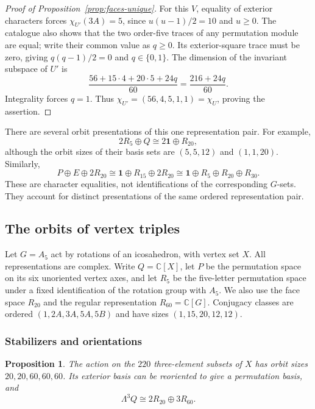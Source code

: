 \documentclass[11pt,a4paper]{article}
\newtheorem{proposition}{Proposition}[section]
\begin{document}
\begin{proof}[Proof of Proposition~\ref{prop:faces-unique}]
For this $V$, equality of exterior characters forces
$\chi_{U'}(3A)=5$, since $u(u-1)/2=10$ and $u\geq0$. The catalogue
also shows that the two order-five traces of any permutation module are
equal; write their common value as $q\geq0$. Its exterior-square trace
must be zero, giving $q(q-1)/2=0$ and $q\in\{0,1\}$.
The dimension of the invariant subspace of $U'$ is
\[
\frac{56+15\cdot4+20\cdot5+24q}{60}
=\frac{216+24q}{60}.
\]
Integrality forces $q=1$. Thus
$\chi_{U'}=(56,4,5,1,1)=\chi_U$, proving the assertion.
\end{proof}

There are several orbit presentations of this one representation pair.
For example,
\[
2R_5\oplus Q\cong2\mathbf1\oplus R_{20},
\]
although the orbit sizes of their basis sets are $(5,5,12)$ and
$(1,1,20)$. Similarly,
\[
P\oplus E\oplus2R_{20}
\cong\mathbf1\oplus R_{15}\oplus2R_{20}
\cong\mathbf1\oplus R_5\oplus R_{20}\oplus R_{30}.
\]
These are character equalities, not identifications of the corresponding
$G$-sets. They account for distinct presentations of the same ordered
representation pair.

\subsection{The orbits of vertex triples}\label{subsec:A6}

Let $G=A_5$ act by rotations of an icosahedron, with vertex set $X$.
All representations are complex. Write $Q=\mathbb C[X]$, let $P$ be
the permutation space on its six unoriented vertex axes, and let $R_5$
be the five-letter permutation space under a fixed identification of
the rotation group with $A_5$. We also use the face space $R_{20}$ and
the regular representation $R_{60}=\mathbb C[G]$. Conjugacy classes
are ordered $(1,2A,3A,5A,5B)$ and have sizes $(1,15,20,12,12)$.

\subsubsection*{Stabilizers and orientations}

\begin{proposition}\label{prop:triples-orbits}
The action on the $220$ three-element subsets of $X$ has orbit sizes
$20,20,60,60,60$. Its exterior basis can be reoriented to give a
permutation basis, and
\[
\Lambda^3Q\cong2R_{20}\oplus3R_{60}.
\]
\end{proposition}
\end{document}
